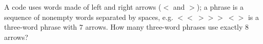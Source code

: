 A code uses words made of left and right arrows ($<$ and $>$); a phrase is a sequence of nonempty words separated by spaces, e.g. $<<\ >>>\ <>$ is a three-word phrase with $7$ arrows. How many three-word phrases use exactly $8$ arrows?
